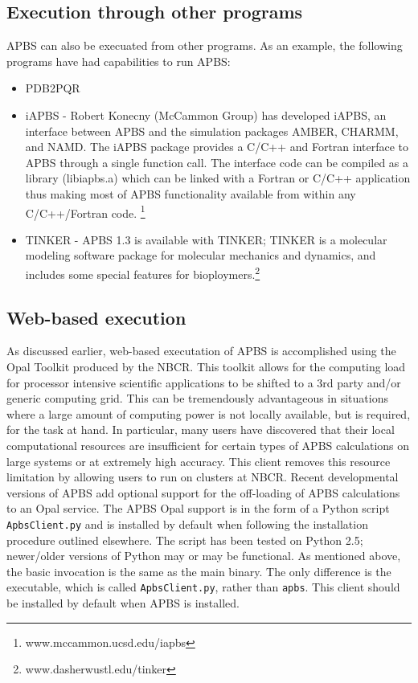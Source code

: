 \documentclass[11pt,titlepage]{article}
\begin{document}
\subsection{Execution through other programs}
APBS can also be execuated from other programs. As an example, the following programs have had capabilities to run APBS:
\begin{itemize}
	\itemsep-0.25em
	\item PDB2PQR
	\item iAPBS - Robert Konecny (McCammon Group) has developed iAPBS, an interface between APBS and the simulation packages AMBER, CHARMM, and NAMD. The iAPBS package provides a C/C++ and Fortran interface to APBS through a single function call. The interface code can be compiled as a library (libiapbs.a) which can be linked with a Fortran or C/C++ application thus making most of APBS functionality available from within any C/C++/Fortran code. \footnote{www.mccammon.ucsd.edu/iapbs} 
	\item TINKER - APBS 1.3 is available with TINKER; TINKER is a molecular modeling software package for molecular mechanics and dynamics, and includes some special features for bioploymers.\footnote{www.dasherwustl.edu/tinker}
\end{itemize}

\subsection{Web-based execution}

As discussed earlier, web-based executation of APBS is accomplished using the Opal Toolkit produced by the NBCR. This toolkit allows for the computing load for processor intensive scientific applications to be shifted to a 3rd party and/or generic computing grid. This can be tremendously advantageous in situations where a large amount of computing power is not locally available, but is required, for the task at hand. In particular, many users have discovered that their local computational resources are insufficient for certain types of APBS calculations on large systems or at extremely high accuracy. This client removes this resource limitation by allowing users to run on clusters at NBCR. Recent developmental versions of APBS add optional support for the off-loading of APBS calculations to an Opal service. 
The APBS Opal support is in the form of a Python script  \texttt{ApbsClient.py} and is installed by default when following the installation procedure outlined elsewhere. The script has been tested on Python 2.5; newer/older versions of Python may or may be functional. As mentioned above, the basic invocation is the same as the main binary. The only difference is the executable, which is called  \texttt{ApbsClient.py}, rather than  \texttt{apbs}. This client should be installed by default when APBS is installed. 
\end{document}
